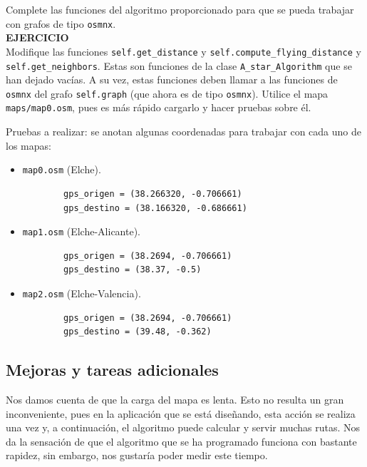 \documentclass{article}
\begin{document}
\begin{exercise}
Complete las funciones del algoritmo proporcionado para que se pueda trabajar con grafos de tipo \texttt{osmnx}.\\
\textbf{EJERCICIO}\\
Modifique las funciones \texttt{self.get\_distance} y \texttt{self.compute\_flying\_distance} y \texttt{self.get\_neighbors}. Estas son funciones de la clase \texttt{A\_star\_Algorithm} que se han dejado vacías. A su vez, estas funciones deben llamar a las funciones de \texttt{osmnx} del grafo \texttt{self.graph} (que ahora es de tipo \texttt{osmnx}). Utilice el mapa \texttt{maps/map0.osm}, pues es más rápido cargarlo y hacer pruebas sobre él.    
\end{exercise}

\begin{exercise}
Pruebas a realizar: se anotan algunas coordenadas para trabajar con cada uno de los mapas:
\begin{itemize}
    \item \texttt{map0.osm} (Elche).
    \begin{verbatim}
        gps_origen = (38.266320, -0.706661)
        gps_destino = (38.166320, -0.686661)   
    \end{verbatim}
    
    \item \texttt{map1.osm} (Elche-Alicante).
    \begin{verbatim}
        gps_origen = (38.2694, -0.706661)
        gps_destino = (38.37, -0.5)
    \end{verbatim}

    \item \texttt{map2.osm} (Elche-Valencia).
    \begin{verbatim}
        gps_origen = (38.2694, -0.706661)
        gps_destino = (39.48, -0.362)
    \end{verbatim}
\end{itemize}
\end{exercise}

    
\subsection{Mejoras y tareas adicionales}
Nos damos cuenta de que la carga del mapa es lenta. Esto no resulta un gran inconveniente, pues en la aplicación que se está diseñando, esta acción se realiza una vez y, a continuación, el algoritmo puede calcular y servir muchas rutas. Nos da la sensación de que el algoritmo que se ha programado funciona con bastante rapidez, sin embargo, nos gustaría poder medir este tiempo. 
\end{document}
